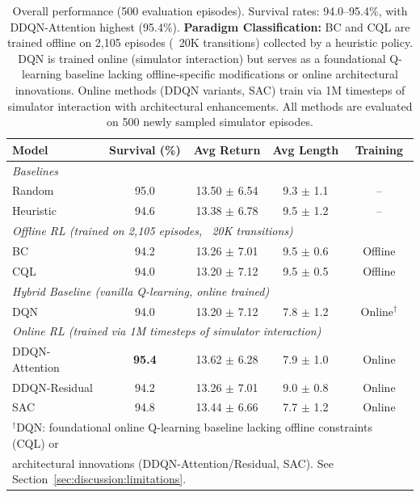 \begin{table}[htbp]
\centering
\caption{Overall performance (500 evaluation episodes). Survival rates: 94.0--95.4\%, with DDQN-Attention highest (95.4\%). \textbf{Paradigm Classification:} BC and CQL are trained offline on 2,105 episodes (~20K transitions) collected by a heuristic policy. DQN is trained online (simulator interaction) but serves as a foundational Q-learning baseline lacking offline-specific modifications or online architectural innovations. Online methods (DDQN variants, SAC) train via 1M timesteps of simulator interaction with architectural enhancements. All methods are evaluated on 500 newly sampled simulator episodes.}
\label{tab:overall-performance}
\begin{tabular}{lcccc}
\toprule
\textbf{Model} & \textbf{Survival (\%)} & \textbf{Avg Return} & \textbf{Avg Length} & \textbf{Training} \\
\midrule
\multicolumn{5}{l}{\textit{Baselines}} \\
Random          & 95.0               & 13.50 $\pm$ 6.54    & 9.3 $\pm$ 1.1       & -- \\
Heuristic       & 94.6               & 13.38 $\pm$ 6.78    & 9.5 $\pm$ 1.2       & -- \\
\midrule
\multicolumn{5}{l}{\textit{Offline RL (trained on 2,105 episodes, ~20K transitions)}} \\
BC              & 94.2               & 13.26 $\pm$ 7.01    & 9.5 $\pm$ 0.6       & Offline \\
CQL             & 94.0               & 13.20 $\pm$ 7.12    & 9.5 $\pm$ 0.5       & Offline \\
\midrule
\multicolumn{5}{l}{\textit{Hybrid Baseline (vanilla Q-learning, online trained)}} \\
DQN             & 94.0               & 13.20 $\pm$ 7.12    & 7.8 $\pm$ 1.2       & Online$^\dagger$ \\
\midrule
\multicolumn{5}{l}{\textit{Online RL (trained via 1M timesteps of simulator interaction)}} \\
DDQN-Attention  & \textbf{95.4}      & 13.62 $\pm$ 6.28    & 7.9 $\pm$ 1.0       & Online \\
DDQN-Residual   & 94.2               & 13.26 $\pm$ 7.01    & 9.0 $\pm$ 0.8       & Online \\
SAC             & 94.8               & 13.44 $\pm$ 6.66    & 7.7 $\pm$ 1.2       & Online \\
\bottomrule
\multicolumn{5}{l}{\scriptsize $^\dagger$DQN: foundational online Q-learning baseline lacking offline constraints (CQL) or} \\
\multicolumn{5}{l}{\scriptsize architectural innovations (DDQN-Attention/Residual, SAC). See Section~\ref{sec:discussion:limitations}.} \\
\end{tabular}
\end{table}

